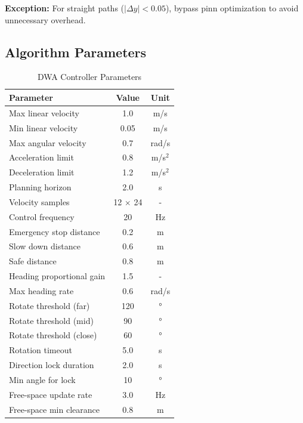 \textbf{Exception:} For straight paths ($|\Delta y| < 0.05$), bypass \acrshort{pinn} optimization to avoid unnecessary overhead.

\subsection{Algorithm Parameters}

\begin{table}[h]
\centering
\caption{DWA Controller Parameters}
\label{tab:dwa_params}
\begin{tabular}{lcc}
\toprule
\textbf{Parameter} & \textbf{Value} & \textbf{Unit} \\
\midrule
Max linear velocity & 1.0 & m/s \\
Min linear velocity & 0.05 & m/s \\
Max angular velocity & 0.7 & rad/s \\
Acceleration limit & 0.8 & m/s$^2$ \\
Deceleration limit & 1.2 & m/s$^2$ \\
Planning horizon & 2.0 & s \\
Velocity samples & 12 $\times$ 24 & - \\
Control frequency & 20 & Hz \\
Emergency stop distance & 0.2 & m \\
Slow down distance & 0.6 & m \\
Safe distance & 0.8 & m \\
Heading proportional gain & 1.5 & - \\
Max heading rate & 0.6 & rad/s \\
Rotate threshold (far) & 120 & ° \\
Rotate threshold (mid) & 90 & ° \\
Rotate threshold (close) & 60 & ° \\
Rotation timeout & 5.0 & s \\
Direction lock duration & 2.0 & s \\
Min angle for lock & 10 & ° \\
Free-space update rate & 3.0 & Hz \\
Free-space min clearance & 0.8 & m \\
\bottomrule
\end{tabular}
\end{table}


